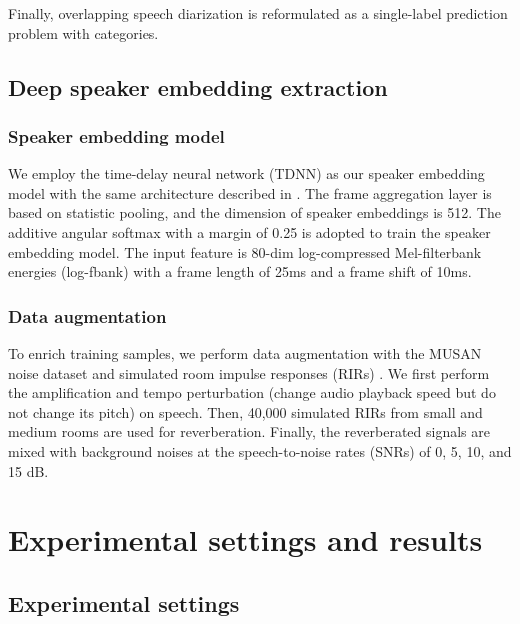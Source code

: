 \documentclass[a4paper]{article}
\begin{document}
Finally, overlapping speech diarization is reformulated as a single-label prediction problem with  categories.


\subsection{Deep speaker embedding extraction}
\subsubsection{Speaker embedding model}
We employ the time-delay neural network (TDNN) as our speaker embedding model with the same architecture described in \cite{SnyderGPK17}.
The frame aggregation layer is based on statistic pooling, and the dimension of speaker embeddings is 512.
The additive angular softmax \cite{DengGXZ19} with a margin of 0.25 is adopted to train the speaker embedding model.
The input feature is 80-dim log-compressed Mel-filterbank energies (log-fbank) with a frame length of 25ms and a frame shift of 10ms.

\subsubsection{Data augmentation}
To enrich training samples, we perform data augmentation with the MUSAN noise dataset \cite{musan2015} and simulated room impulse responses (RIRs) \cite{KoPPSK17}.
We first perform the amplification and tempo perturbation (change audio playback speed but do not change its pitch) on speech.
Then, 40,000 simulated RIRs from small and medium rooms are used for reverberation.
Finally, the reverberated signals are mixed with background noises at the speech-to-noise rates (SNRs) of 0, 5, 10, and 15 dB.


\section{Experimental settings and results}
\subsection{Experimental settings}
\end{document}

